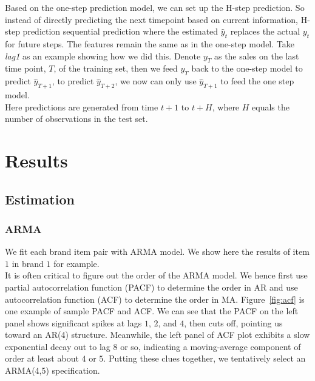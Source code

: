 \documentclass{article}
\begin{document}
\noindent Based on the one-step prediction model, we can set up the H-step prediction. So instead of directly predicting the next timepoint based on current information, H-step prediction sequential prediction where the estimated $\hat{y}_t$ replaces the actual $y_t$ for future steps. The features remain the same as in the one-step model. Take \textit{lag1} as an example showing how we did this. Denote $y_T$ as the sales on the last time point, $T$, of the training set, then we feed $y_T$ back to the one-step model to predict $\hat{y}_{T+1}$, to predict $\hat{y}_{T+2}$, we now can only use $\hat{y}_{T+1}$ to feed the one step model. \\

\noindent Here predictions are generated from time $t+1$ to $t+H$, where $H$ equals the number of observations in the test set.


\section{Results}

\subsection{Estimation}

\subsubsection{ARMA}
\noindent We fit each brand item pair with ARMA model. We show here the results of item $1$ in brand $1$ for example. \\

\noindent It is often critical to figure out the order of the ARMA model. We hence first use partial autocorrelation function (PACF) to determine the order in AR and use autocorrelation function (ACF) to determine the order in MA. Figure~\ref{fig:acf} is one example of sample PACF and ACF. We can see that the PACF on the left panel shows significant spikes at lags $1$, $2$, and $4$, then cuts off, pointing us toward an AR(4) structure. Meanwhile, the left panel of ACF plot exhibits a slow exponential decay out to lag $8$ or so,  indicating a moving-average component of order at least about $4$ or $5$. Putting these clues together, we tentatively select an ARMA(4,5) specification. \\
\end{document}
